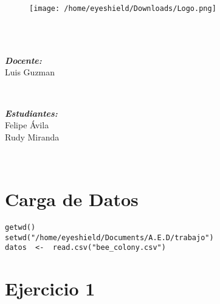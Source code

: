 \documentclass[b4paper]{article}
\begin{document}
    \begin{figure}
        \texttt{[image: /home/eyeshield/Downloads/Logo.png]}
    \end{figure}
    \begin{center}
        \\[0.2cm]
        \\[1cm]
        \begin{minipage}{0.4\textwidth}
            \begin{flushleft} \large
                \emph{\textbf{Docente:}}\\
                \textup{Luis Guzman}
            \end{flushleft}
        \end{minipage}
        ~
        \begin{minipage}{0.4\textwidth}
            \begin{flushright} \large
                \emph{\textbf{Estudiantes:}} \\
                \textup{Felipe \'Avila}\\
                \textup{Rudy Miranda}
            \end{flushright}
        \end{minipage}\\[1cm]
        \makeatother
    \end{center}
    \tableofcontents
    \listoffigures
    \listoftables

    \newpage
    \section{Carga de Datos}
    \begin{tcolorbox}
        \begin{verbatim}
getwd()
setwd("/home/eyeshield/Documents/A.E.D/trabajo")
datos  <-  read.csv("bee_colony.csv")\end{verbatim}
    \end{tcolorbox}
    \section{Ejercicio 1}
\end{document}
